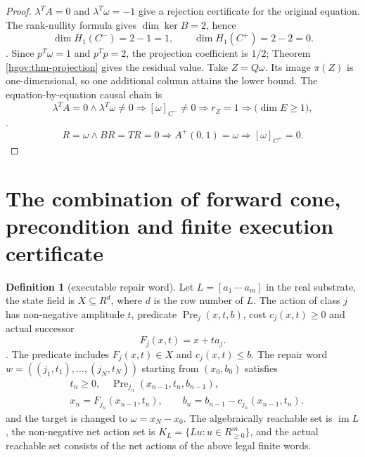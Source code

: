 \documentclass[12pt,a4paper,openany,notitlepage]{report}
\theoremstyle{plain}
\theoremstyle{definition}
\newtheorem{definition}[theorem]{Definition}
\theoremstyle{remark}
\def\mathcal#1{#1}\def\mathsf#1{#1}\def\mathbb#1{#1}%
\begin{document}
\begin{CJK*}
\begin{proof}
$\lambda^{\mathsf T}A=0$ and $\lambda^{\mathsf T}\omega=-1$ give a rejection certificate for the original equation. The rank-nullity formula gives $\dim\ker B=2$, hence
\[
 \dim H_1(C^-)=2-1=1,\qquad
 \dim H_1(C^+)=2-2=0.
\].
Since $p^{\mathsf T}\omega=1$ and $p^{\mathsf T}p=2$, the projection coefficient is $1/2$; Theorem ~ \ref{hgov:thm-projection} gives the residual value. Take $Z=\mathbb Q\omega$. Its image $\pi(Z)$ is one-dimensional, so one additional column attains the lower bound. The equation-by-equation causal chain is
\[
 \lambda^{\mathsf T}A=0\wedge
 \lambda^{\mathsf T}\omega\ne0
 \Longrightarrow[\omega]_{C^-}\ne0
 \Longrightarrow r_Z=1
 \Longrightarrow
 \bigl(\dim E\ge1\bigr),
\].
\[
 R=\omega\wedge BR=TR=0
 \Longrightarrow A^+(0,1)=\omega
 \Longrightarrow[\omega]_{C^+}=0.
\]
\end{proof}

\section { The combination of forward cone, precondition and finite execution certificate }\label{hgov:executable}


\begin{definition}
[executable repair word]\label{hgov:def-executable}
Let $L=[a_1\ \cdots\ a_m]$ in the real substrate, the state field is $X\subseteq\mathbb R^d$, where $d$ is the row number of $L$. The action of class $j$ has non-negative amplitude $t$, predicate $\operatorname{Pre}_j(x,t,b)$, cost $c_j(x,t)\ge0$ and actual successor \[
 F_j(x,t)=x+ta_j.
\]. The predicate includes $F_j(x,t)\in X$ and $c_j(x,t)\le b$. The repair word $w=((j_1,t_1),\ldots,(j_N,t_N))$ starting from $(x_0,b_0)$ satisfies \[
 \begin{aligned}
 &t_n\ge0,\quad
 \operatorname{Pre}_{j_n}(x_{n-1},t_n,b_{n-1}),\\
 &x_n=F_{j_n}(x_{n-1},t_n),\qquad
 b_n=b_{n-1}-c_{j_n}(x_{n-1},t_n).
 \end{aligned}
\] and the target is changed to $\omega=x_N-x_0$. The algebraically reachable set is $\operatorname{im}L$, the non-negative net action set is $\mathcal K_L=\{Lu:u\in\mathbb R_{\ge0}^m\}$, and the actual reachable set consists of the net actions of the above legal finite words.\end{definition}



\end{CJK*}
\end{document}
